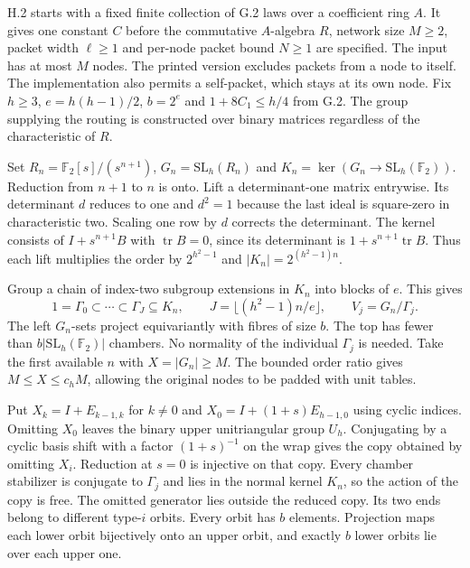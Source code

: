 \newpage
{}\label{sec:14tower}
H.2 starts with a fixed finite collection of G.2 laws over a coefficient ring $A$. It gives one constant $C$ before the commutative $A$-algebra $R$, network size $M\ge2$, packet width $\ell\ge1$ and per-node packet bound $N\ge1$ are specified. The input has at most $M$ nodes. The printed version excludes packets from a node to itself. The implementation also permits a self-packet, which stays at its own node. Fix $h\ge3$, $e=h(h-1)/2$, $b=2^e$ and $1+8C_1\le h/4$ from G.2. The group supplying the routing is constructed over binary matrices regardless of the characteristic of $R$.

Set $R_n=\mathbb F_2[s]/(s^{n+1})$, $G_n=\mathrm{SL}_h(R_n)$ and $K_n=\ker(G_n\to\mathrm{SL}_h(\mathbb F_2))$. Reduction from $n+1$ to $n$ is onto. Lift a determinant-one matrix entrywise. Its determinant $d$ reduces to one and $d^2=1$ because the last ideal is square-zero in characteristic two. Scaling one row by $d$ corrects the determinant. The kernel consists of $I+s^{n+1}B$ with $\operatorname{tr}B=0$, since its determinant is $1+s^{n+1}\operatorname{tr}B$. Thus each lift multiplies the order by $2^{h^2-1}$ and $|K_n|=2^{(h^2-1)n}$.

Group a chain of index-two subgroup extensions in $K_n$ into blocks of $e$. This gives
\[
 1=\Gamma_0\subset\cdots\subset\Gamma_J\subseteq K_n,\qquad
 J=\lfloor(h^2-1)n/e\rfloor,\qquad V_j=G_n/\Gamma_j .
\]
The left $G_n$-sets project equivariantly with fibres of size $b$. The top has fewer than $b|\mathrm{SL}_h(\mathbb F_2)|$ chambers. No normality of the individual $\Gamma_j$ is needed. Take the first available $n$ with $X=|G_n|\ge M$. The bounded order ratio gives $M\le X\le c_hM$, allowing the original nodes to be padded with unit tables.

Put $X_k=I+E_{k-1,k}$ for $k\ne0$ and $X_0=I+(1+s)E_{h-1,0}$ using cyclic indices. Omitting $X_0$ leaves the binary upper unitriangular group $U_h$. Conjugating by a cyclic basis shift with a factor $(1+s)^{-1}$ on the wrap gives the copy obtained by omitting $X_i$. Reduction at $s=0$ is injective on that copy. Every chamber stabilizer is conjugate to $\Gamma_j$ and lies in the normal kernel $K_n$, so the action of the copy is free. The omitted generator lies outside the reduced copy. Its two ends belong to different type-$i$ orbits. Every orbit has $b$ elements. Projection maps each lower orbit bijectively onto an upper orbit, and exactly $b$ lower orbits lie over each upper one.

